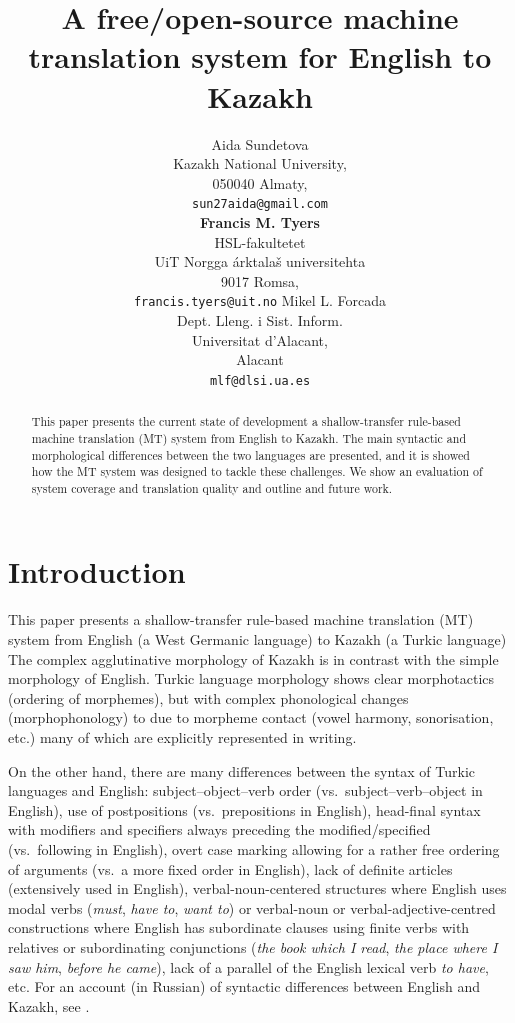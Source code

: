 \documentclass[11pt]{article}
\title{A free/open-source machine translation system for English to Kazakh}
\author{Aida Sundetova\\
  Kazakh National University,  \\
  050040 Almaty, \\
  {\tt sun27aida@gmail.com}\\
  \And
  \textbf{Francis M. Tyers}\\
  HSL-fakultetet\\ 
  UiT Norgga \'{a}rktala\v{s} universitehta \\
  9017 Romsa, \\
  {\tt francis.tyers@uit.no}
  \And
  Mikel L. Forcada\\
  Dept. Lleng. i Sist. Inform. \\
  Universitat d'Alacant, \\ 
  Alacant \\
  {\tt mlf@dlsi.ua.es}  
}
\date{}
\begin{document}
\maketitle 
\renewcommand{\baselinestretch}{0.97} %
 

\begin{abstract}
This paper presents the current state of development a shallow-transfer rule-based machine 
translation (MT) system from English to Kazakh. The main syntactic and morphological differences 
between the two languages are presented, and it is showed how the MT 
system was designed to tackle these challenges. We show an evaluation of system coverage and 
translation quality and outline and future work.
\end{abstract}

\section{Introduction}

This paper presents a shallow-transfer rule-based machine translation (MT) system from English 
(a West Germanic language) to Kazakh (a Turkic language)
The complex agglutinative morphology of Kazakh 
is in contrast with the simple morphology of English.
Turkic language morphology shows clear morphotactics (ordering of morphemes), but with 
complex phonological changes (morphophonology) to due to morpheme contact (vowel harmony, 
sonorisation, etc.) many of which are explicitly represented in writing.

On the other hand, there are many differences between the syntax of Turkic languages 
and English: subject–object–verb order (vs.\ subject–verb–object in English), use of 
postpositions (vs.\ prepositions in English), head-final syntax with modifiers and specifiers 
always preceding the modified/specified (vs.\ following in English), overt case marking allowing 
for a rather free ordering of arguments (vs.\ a more fixed order in English), lack of definite 
articles (extensively used in English), verbal-noun-centered structures where English uses modal 
verbs (\emph{must}, \emph{have to}, \emph{want to}) or verbal-noun or verbal-adjective-centred constructions where 
English has subordinate clauses using finite verbs with relatives or subordinating 
conjunctions (\emph{the book which I read}, \emph{the place where I saw him}, \emph{before he came}), lack of a parallel 
of the English lexical verb \emph{to have}, etc. For an account (in Russian) of 
syntactic differences between English and Kazakh, see \cite{pecherskih2012}.
\end{document}
